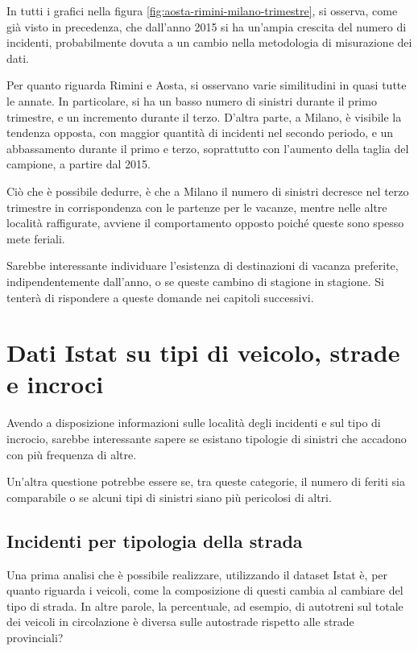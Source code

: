 \documentclass[a4paper]{report}
\begin{document}
In tutti i grafici nella figura \ref{fig:aosta-rimini-milano-trimestre}, 
si osserva, come già visto in precedenza, che dall'anno 2015 si ha un'ampia crescita  
del numero di incidenti, probabilmente dovuta a un cambio 
nella metodologia di misurazione dei dati. 

Per quanto riguarda Rimini e Aosta, si osservano varie similitudini in quasi 
tutte le annate. 
In particolare, si ha un basso numero di sinistri 
durante il primo trimestre, e un incremento durante il terzo. 
D'altra parte, a Milano, è visibile la tendenza opposta, con maggior quantità di 
incidenti nel secondo periodo, e un abbassamento durante il primo 
e terzo, soprattutto con l'aumento della taglia del campione, 
a partire dal 2015. 

Ciò che è possibile dedurre, è che a Milano il numero di sinistri decresce 
nel terzo trimestre in corrispondenza con le partenze per le vacanze, mentre nelle 
altre località raffigurate, avviene il comportamento opposto poiché 
queste sono spesso mete feriali. 

Sarebbe interessante individuare l'esistenza di destinazioni di vacanza preferite, 
indipendentemente dall'anno, o se queste cambino di stagione in stagione. 
Si tenterà di rispondere a queste domande nei capitoli successivi. 


\section{Dati Istat su tipi di veicolo, strade e incroci}

Avendo a disposizione informazioni sulle località degli incidenti 
e sul tipo di incrocio, 
sarebbe interessante sapere se esistano tipologie di sinistri che accadono 
con più frequenza di altre. 

Un'altra questione potrebbe essere se, tra queste categorie, il numero di feriti 
sia comparabile o se alcuni tipi di sinistri siano più pericolosi di altri. 



\subsection{Incidenti per tipologia della strada}

Una prima analisi che è possibile realizzare, utilizzando il dataset Istat è, 
per quanto riguarda i veicoli, 
come la composizione di questi cambia al cambiare del tipo di strada. 
In altre parole, la percentuale, ad esempio, di autotreni sul totale dei veicoli 
in circolazione è diversa sulle autostrade rispetto alle strade provinciali?
\end{document}
